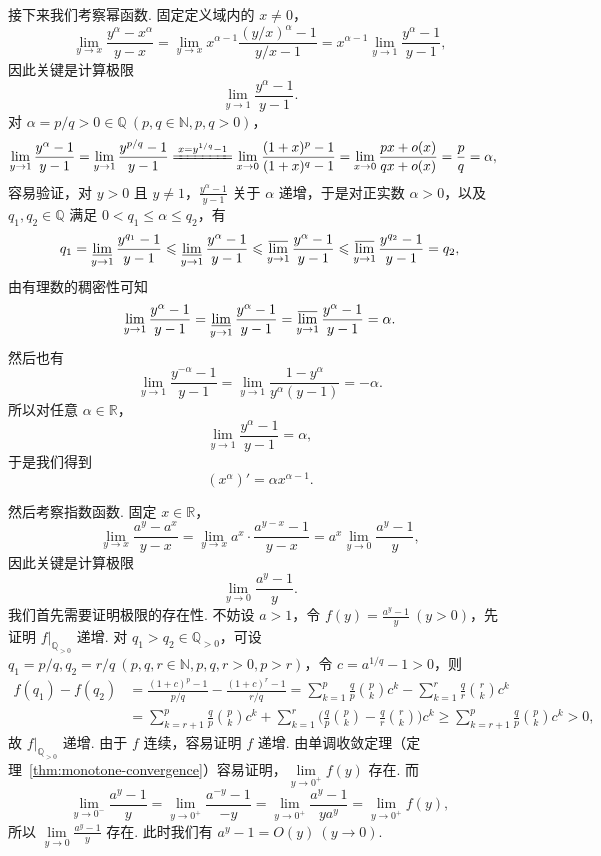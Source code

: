 \documentclass[../main.tex]{subfiles}
\begin{document}
接下来我们考察幂函数. 固定定义域内的 $x \neq 0$，
$$
\lim_{y \to x} \frac{y^\alpha - x^\alpha}{y - x} = \lim_{y \to x} x^{\alpha - 1} \frac{(y / x)^\alpha - 1}{y / x - 1} = x^{\alpha - 1} \lim_{y \to 1} \frac{y^\alpha - 1}{y - 1}, 
$$
因此关键是计算极限 
$$
\lim_{y \to 1} \frac{y^\alpha - 1}{y - 1}. 
$$
对 $\alpha = p / q > 0 \in \mathbb Q \ (p, q \in \mathbb N, p, q > 0)$，
\begin{align*}
    \lim_{y \to 1} \frac{y^\alpha - 1}{y - 1} &= \lim_{y \to 1} \frac{y^{p / q} - 1}{y - 1} \xlongequal{x = y^{1 / q} - 1} \lim_{x \to 0} \frac{(1 + x)^p - 1}{(1 + x)^q - 1} = \lim_{x \to 0} \frac{px + o(x)}{qx + o(x)} = \frac{p}{q} = \alpha, 
\end{align*}
容易验证，对 $y > 0$ 且 $y \neq 1$，$\frac{y^\alpha - 1}{y - 1}$ 关于 $\alpha$ 递增，于是对正实数 $\alpha > 0$，以及 $q_1, q_2 \in \mathbb Q$ 满足 $0 < q_1 \leqslant \alpha \leqslant q_2$，有
$$
q_1 = \varliminf_{y \to 1} \frac{y^{q_1} - 1}{y - 1} \leqslant \varliminf_{y \to 1} \frac{y^\alpha - 1}{y - 1} \leqslant \varlimsup_{y \to 1} \frac{y^\alpha - 1}{y - 1}\leqslant \varlimsup_{y \to 1} \frac{y^{q_2} - 1}{y - 1} = q_2, 
$$
由有理数的稠密性可知
$$
\lim_{y \to 1} \frac{y^\alpha - 1}{y - 1} = \varliminf_{y \to 1} \frac{y^\alpha - 1}{y - 1} = \varlimsup_{y \to 1} \frac{y^\alpha - 1}{y - 1} = \alpha. 
$$
然后也有
$$
\lim_{y \to 1} \frac{y^{-\alpha} - 1}{y - 1} = \lim_{y \to 1} \frac{1 - y^\alpha}{y^\alpha(y - 1)} = -\alpha. 
$$
所以对任意 $\alpha \in \mathbb R$，
$$
\lim_{y \to 1} \frac{y^\alpha - 1}{y - 1} = \alpha, 
$$
于是我们得到
$$
(x^\alpha)' = \alpha x^{\alpha - 1}. 
$$

然后考察指数函数. 固定 $x \in \mathbb R$，
$$
\lim_{y \to x} \frac{a^y - a^x}{y - x} = \lim_{y \to x} a^x \cdot \frac{a^{y - x} - 1}{y - x} = a^x \lim_{y \to 0} \frac{a^y - 1}{y}, 
$$
因此关键是计算极限 
$$
\lim_{y \to 0} \frac{a^y - 1}{y}. 
$$
我们首先需要证明极限的存在性. 不妨设 $a > 1$，令 $f(y) = \frac{a^y - 1}{y}\ (y > 0)$，先证明 $f|_{\mathbb Q_{>0}}$ 递增. 对 $q_1 > q_2 \in \mathbb Q_{>0}$，可设 $q_1 = p / q, q_2 = r / q\ (p, q, r \in \mathbb N, p, q, r > 0, p > r)$，令 $c = a^{1 / q} - 1 > 0$，则
\begin{align*}
    f(q_1) - f(q_2) &= \frac{(1 + c)^p - 1}{p / q} - \frac{(1 + c)^r - 1}{r / q} 
    = \sum_{k = 1}^{p} \frac{q}{p} \binom{p}{k} c^k - \sum_{k = 1}^{r} \frac{q}{r} \binom{r}{k} c^k \\
    &= \sum_{k = r + 1}^{p} \frac{q}{p} \binom{p}{k} c^k + \sum_{k = 1}^{r} \bigg( \frac{q}{p} \binom{p}{k} - \frac{q}{r} \binom{r}{k} \bigg) c^k \geqslant \sum_{k = r + 1}^{p} \frac{q}{p} \binom{p}{k} c^k > 0, 
\end{align*}
故 $f|_{\mathbb Q_{>0}}$ 递增. 由于 $f$ 连续，容易证明 $f$ 递增. 由单调收敛定理（定理~\ref{thm:monotone-convergence}）容易证明，$\lim\limits_{y \to 0^+} f(y)$ 存在. 而 
$$
\lim_{y \to 0^-} \frac{a^y - 1}{y} = \lim_{y \to 0^+} \frac{a^{-y} - 1}{-y} = \lim_{y \to 0^+} \frac{a^y - 1}{y a^y} = \lim_{y \to 0^+} f(y), 
$$
所以 $\lim\limits_{y \to 0} \frac{a^y - 1}{y}$ 存在. 此时我们有 $a^y - 1 = O(y)\ (y \to 0)$. 
\end{document}
